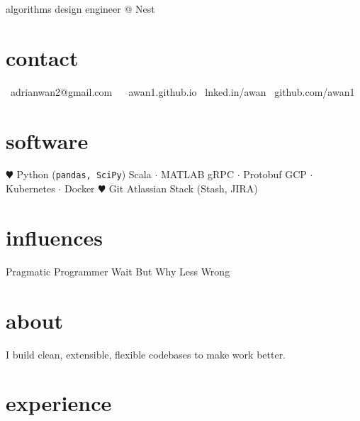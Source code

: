 \documentclass[]{friggeri-cv}
\begin{document}
       {algorithms design engineer @ Nest}


\begin{aside}
  \section{contact}
    \href{mailto:adrianwan2@gmail.com?subject=Regarding%20your%20resume}{\faEnvelope}~adrianwan2@gmail.com
    ~
    \href{http://awan1.github.io}{\faGlobe}~awan1.github.io
    \href{http://linkedin.com/in/adrianwan2}{\faLinkedin}~lnked.in/awan
    \href{http://github.com/awan1}{\faGithub}~github.com/awan1
  \section{software}
    {\color{red} $\varheart$} Python
    (\texttt{pandas, SciPy})
    Scala $\cdot$ MATLAB
    gRPC $\cdot$ Protobuf
    GCP $\cdot$ Kubernetes $\cdot$ Docker
    {\color{red} $\varheart$} Git
    Atlassian Stack
    (Stash, JIRA)
  \section{influences}
    Pragmatic Programmer
    Wait But Why
    Less Wrong
\end{aside}

\section{about}
I build clean, extensible, flexible codebases to make work better.


\section{experience}
\end{document}
